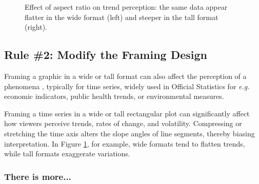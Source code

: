 \documentclass[11pt,twoside,a4paper]{article}
\begin{document}
 \begin{figure}[h]
 \centering
 \hspace{1cm}
 \caption{Effect of aspect ratio on trend perception: the same data appear flatter in the wide format (left) and steeper in the tall format (right).}
 \label{fig:aspect-ratio-comparison}
 \end{figure}


\subsection*{Rule \#2: Modify the Framing Design}

Framing a graphic in a wide or tall format can also affect the perception of a phenomena \citep{Pandey2015Deceptive}, typically for time series,  widely used in Official Statistics for \textit{e.g.} economic indicators, public health trends, or environmental measures.


Framing a time series in a wide or tall rectangular plot can significantly affect how viewers perceive trends, rates of change, and volatility. Compressing or stretching the time axis alters the slope angles of line segments, thereby biasing interpretation. In Figure \ref{fig:aspect-ratio-comparison}, for example, wide formats tend to flatten trends, while tall formats exaggerate variations.



\subsubsection*{There is more...}
\end{document}
